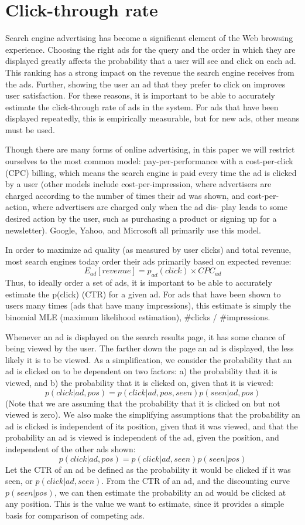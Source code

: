 \documentclass{book}
\begin{document}
\chapter{Click-through rate}
Search engine advertising has become a significant element of the Web browsing experience. Choosing the right ads for the query and the order in which they are displayed greatly affects the probability that a user will see and click on each ad. This ranking has a strong impact on the revenue the search engine receives from the ads. Further, showing the user an ad that they prefer to click on improves user satisfaction. For these reasons, it is important to be able to accurately estimate the click-through rate of ads in the system. For ads that have been displayed repeatedly, this is empirically measurable, but for new ads, other means must be used.

Though there are many forms of online advertising, in this paper we will restrict ourselves to the most common model: pay-per-performance with a cost-per-click (CPC) billing, which means the search engine is paid every time the ad is clicked by a user (other models include cost-per-impression, where advertisers are charged according to the number of times their ad was shown, and cost-per-action, where advertisers are charged only when the ad dis- play leads to some desired action by the user, such as purchasing a product or signing up for a newsletter). Google, Yahoo, and Microsoft all primarily use this model.

In order to maximize ad quality (as measured by user clicks) and total revenue, most search engines today order their ads primarily based on expected revenue:
\[ E_{ad}[revenue] = p_{ad}(click) \times CPC_{ad} \]
Thus, to ideally order a set of ads, it is important to be able to accurately estimate the p(click) (CTR) for a given ad. For ads that have been shown to users many times (ads that have many impressions), this estimate is simply the binomial MLE (maximum likelihood estimation), \#clicks / \#impressions.

Whenever an ad is displayed on the search results page, it has some chance of being viewed by the user. The farther down the page an ad is displayed, the less likely it is to be viewed. As a simplification, we consider the probability that an ad is clicked on to be dependent on two factors: a) the probability that it is viewed, and b) the probability that it is clicked on, given that it is viewed:
\[ p(click|ad, pos) = p(click|ad, pos, seen)p(seen|ad, pos) \]
(Note that we are assuming that the probability that it is clicked on but not viewed is zero). We also make the simplifying assumptions that the probability an ad is clicked is independent of its position, given that it was viewed, and that the probability an ad is viewed is independent of the ad, given the position, and independent of the other ads shown:
\[ p(click|ad, pos) = p(click|ad, seen)p(seen| pos) \]
Let the CTR of an ad be defined as the probability it would be clicked if it was seen, or $p(click|ad, seen)$. From the CTR of an ad, and the discounting curve $p(seen|pos)$, we can then estimate the probability an ad would be clicked at any position. This is the value we want to estimate, since it provides a simple basis for comparison of competing ads.
\end{document}
